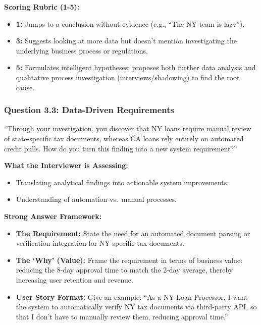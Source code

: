 \documentclass[
  11pt,
  openany,
  oneside]{book}
\providecommand{\tightlist}{%
  \setlength{\itemsep}{0pt}\setlength{\parskip}{0pt}}
\begin{document}
\textbf{Scoring Rubric (1-5):}

\begin{itemize}
\tightlist
\item
  \textbf{1:} Jumps to a conclusion without evidence (e.g., ``The NY
  team is lazy'').
\item
  \textbf{3:} Suggests looking at more data but doesn't mention
  investigating the underlying business process or regulations.
\item
  \textbf{5:} Formulates intelligent hypotheses; proposes both further
  data analysis and qualitative process investigation
  (interviews/shadowing) to find the root cause.
\end{itemize}

\subsubsection{Question 3.3: Data-Driven
Requirements}\label{question-3.3-data-driven-requirements}

``Through your investigation, you discover that NY loans require manual
review of state-specific tax documents, whereas CA loans rely entirely
on automated credit pulls. How do you turn this finding into a new
system requirement?''

\textbf{What the Interviewer is Assessing:}

\begin{itemize}
\tightlist
\item
  Translating analytical findings into actionable system improvements.
\item
  Understanding of automation vs.~manual processes.
\end{itemize}

\textbf{Strong Answer Framework:}

\begin{itemize}
\tightlist
\item
  \textbf{The Requirement:} State the need for an automated document
  parsing or verification integration for NY specific tax documents.
\item
  \textbf{The `Why' (Value):} Frame the requirement in terms of business
  value: reducing the 8-day approval time to match the 2-day average,
  thereby increasing user retention and revenue.
\item
  \textbf{User Story Format:} Give an example: ``As a NY Loan Processor,
  I want the system to automatically verify NY tax documents via
  third-party API, so that I don't have to manually review them,
  reducing approval time.''
\end{itemize}
\end{document}
